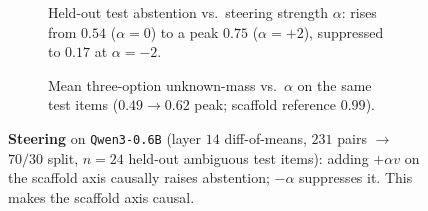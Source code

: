 \begin{figure}[htbp]\centering
  \begin{subfigure}{0.49\linewidth}\centering
    \caption{Held-out test abstention vs.\ steering strength $\alpha$: rises from
      $0.54$ ($\alpha{=}0$) to a peak $0.75$ ($\alpha{=}{+}2$), suppressed to
      $0.17$ at $\alpha{=}{-}2$.}
    \label{fig:steer-abstain}
  \end{subfigure}\hfill
  \begin{subfigure}{0.49\linewidth}\centering
    \caption{Mean three-option unknown-mass vs.\ $\alpha$ on the same test items
      ($0.49 \to 0.62$ peak; scaffold reference $0.99$).}
    \label{fig:steer-unknown}
  \end{subfigure}
  \caption{\textbf{Steering} on \texttt{Qwen3-0.6B} (layer $14$ diff-of-means,
    $231$ pairs $\to$ $70/30$ split, $n{=}24$ held-out ambiguous test items):
    adding $+\alpha v$ on the scaffold axis causally raises abstention; $-\alpha$
    suppresses it. This makes the  scaffold axis causal.}
  \label{fig:steer}
\end{figure}

